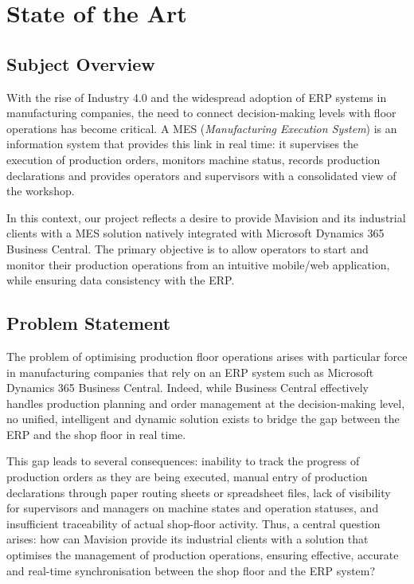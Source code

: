\section{State of the Art}

\subsection{Subject Overview}

With the rise of Industry 4.0 and the widespread adoption of ERP systems in
manufacturing companies, the need to connect decision-making levels with floor
operations has become critical. A MES (\textit{Manufacturing Execution System}) is
an information system that provides this link in real time: it supervises the
execution of production orders, monitors machine status, records production
declarations and provides operators and supervisors with a consolidated view of
the workshop.

In this context, our project reflects a desire to provide Mavision and its industrial
clients with a MES solution natively integrated with Microsoft Dynamics 365 Business
Central. The primary objective is to allow operators to start and monitor their
production operations from an intuitive mobile/web application, while ensuring data
consistency with the ERP.

\subsection{Problem Statement}

The problem of optimising production floor operations arises with particular force in
manufacturing companies that rely on an ERP system such as Microsoft Dynamics 365
Business Central. Indeed, while Business Central effectively handles production
planning and order management at the decision-making level, no unified, intelligent and
dynamic solution exists to bridge the gap between the ERP and the shop floor in real
time.

This gap leads to several consequences: inability to track the progress of production
orders as they are being executed, manual entry of production declarations through
paper routing sheets or spreadsheet files, lack of visibility for supervisors and
managers on machine states and operation statuses, and insufficient traceability of
actual shop-floor activity. Thus, a central question arises: how can Mavision provide
its industrial clients with a solution that optimises the management of production
operations, ensuring effective, accurate and real-time synchronisation between the shop
floor and the ERP system?

